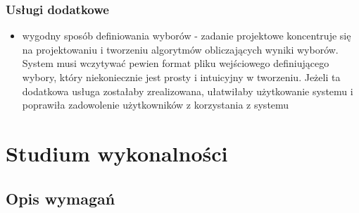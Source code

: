 \documentclass[polish,11pt]{aghthesis}
\begin{document}
\subsubsection{Usługi dodatkowe}
\begin{itemize}
    \item wygodny sposób definiowania wyborów - zadanie projektowe koncentruje się na
projektowaniu i tworzeniu algorytmów obliczających wyniki wyborów. System musi
wczytywać pewien format pliku wejściowego definiującego wybory, który niekoniecznie jest prosty i intuicyjny w tworzeniu. Jeżeli ta dodatkowa usługa zostałaby zrealizowana, ułatwiłaby użytkowanie systemu i poprawiła zadowolenie użytkowników z korzystania z systemu
\end{itemize}


\section{Studium wykonalności}
  
\subsection{Opis wymagań}
\end{document}
